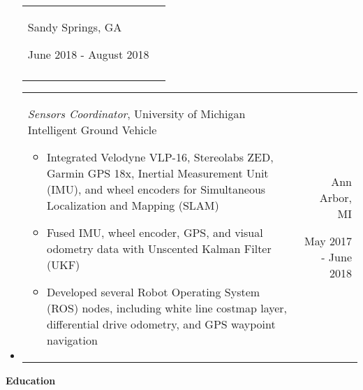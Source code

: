 \documentclass[9pt]{memoir}
\begin{document}
\begin{itemize}
\begin{tabular}[t]{lr}
\begin{minipage}[t]{0.2 \textwidth}
\normalsize
Sandy Springs, GA

\small
June 2018 - August 2018
\end{minipage}

\\ \\

\end{tabular}

\item

\begin{tabular}[t]{lr}

\begin{minipage}[t]{0.7 \textwidth}
\raggedright

\normalsize
\textit{Sensors Coordinator}, University of Michigan Intelligent Ground Vehicle

\small

\begin{itemize}
\item Integrated Velodyne VLP-16, Stereolabs ZED, Garmin GPS 18x, Inertial
      Measurement Unit (IMU), and wheel encoders for Simultaneous Localization
      and Mapping (SLAM)
\item Fused IMU, wheel encoder, GPS, and visual odometry data with Unscented
      Kalman Filter (UKF)
\item Developed several Robot Operating System (ROS) nodes, including white line
      costmap layer, differential drive odometry, and GPS waypoint navigation
\end{itemize}

\end{minipage}

&

\begin{minipage}[t]{0.2 \textwidth}
\raggedleft

\normalsize
Ann Arbor, MI

\small
May 2017 - June 2018
\end{minipage}

\\

\end{tabular}
\end{itemize}

\begin{mdframed}
\textbf{Education}
\end{mdframed}
\end{document}
